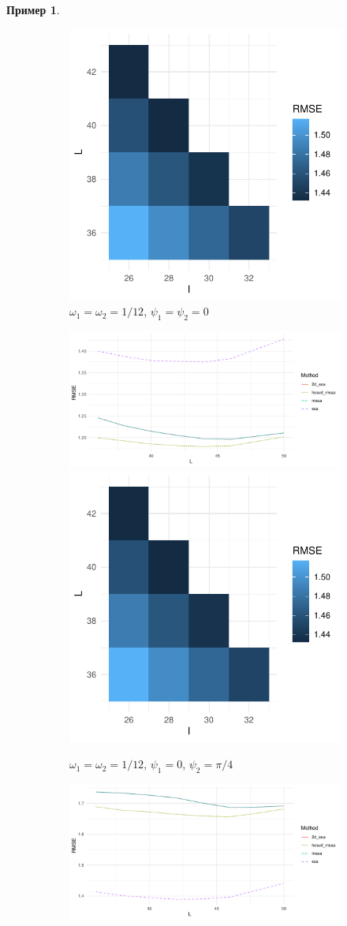 \documentclass[specialist,
    substylefile = spbu_report.rtx,
    subf,href,colorlinks=true, 12pt]{disser}
\theoremstyle{plain}
\theoremstyle{definition}
\newtheorem{example}{Пример}[section]
\theoremstyle{remark}
\begin{document}
\begin{example}
\begin{figure}
\begin{subfigure}{\linewidth}
                \includegraphics[width=.34\linewidth]{two-series-first_hooi}
                \caption{$\omega_1=\omega_2=1/12$, $\psi_1=\psi_2=0$}
            \end{subfigure} \par\medskip
            \begin{subfigure}{\linewidth}
                \includegraphics[width=.66\linewidth]{two-series-second}\hfill
                \includegraphics[width=.34\linewidth]{two-series-second_hooi}
                \caption{$\omega_1=\omega_2=1/12$, $\psi_1=0$, $\psi_2=\pi / 4$}
            \end{subfigure}
            \begin{subfigure}{\linewidth}
                \includegraphics[width=.66\linewidth]{two-series-third}\hfill

\end{subfigure}
\end{figure}
\end{example}
\end{document}
